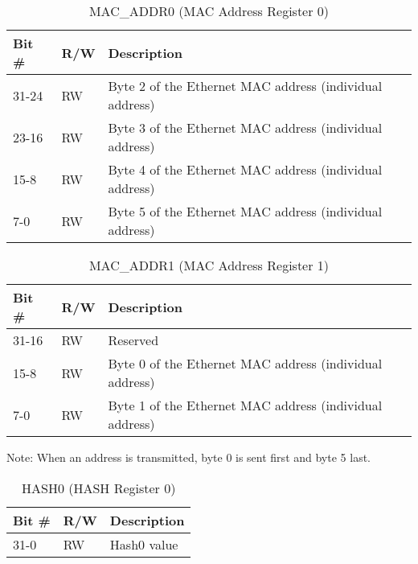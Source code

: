 \begin{table}[H]
  \centering
  \begin{tabularx}{\textwidth}{|l|l|X|}
    
    \hline
    \rowcolor{iob-green}
    {\bf Bit \#} & {\bf R/W} & {\bf Description} \\ \hline

    31-24   & RW  & Byte 2 of the Ethernet MAC address (individual address) \\
                    \hline
    \rowcolor{iob-blue}
    23-16   & RW  & Byte 3 of the Ethernet MAC address (individual address) \\
                    \hline
    15-8    & RW  & Byte 4 of the Ethernet MAC address (individual address) \\
                    \hline
    \rowcolor{iob-blue}
    7-0     & RW  & Byte 5 of the Ethernet MAC address (individual address) \\
                    \hline
  \end{tabularx}
    \caption{MAC\_ADDR0 (MAC Address Register 0)}
  \label{swreg_details:mac_addr0}
\end{table}

\begin{table}[H]
  \centering
  \begin{tabularx}{\textwidth}{|l|l|X|}
    
    \hline
    \rowcolor{iob-green}
    {\bf Bit \#} & {\bf R/W} & {\bf Description} \\ \hline

    31-16   & RW  & Reserved \\ \hline
    \rowcolor{iob-blue}
    15-8    & RW  & Byte 0 of the Ethernet MAC address (individual address) \\
                    \hline
    7-0     & RW  & Byte 1 of the Ethernet MAC address (individual address) \\
                    \hline
  \end{tabularx}
    \caption{MAC\_ADDR1 (MAC Address Register 1)}
  \label{swreg_details:mac_addr1}
\end{table}

Note: When an address is transmitted, byte 0 is sent first and byte 5 last.

\begin{table}[H]
  \centering
  \begin{tabularx}{\textwidth}{|l|l|X|}
    
    \hline
    \rowcolor{iob-green}
    {\bf Bit \#} & {\bf R/W} & {\bf Description} \\ \hline

    31-0   & RW  & Hash0 value \\ \hline
  \end{tabularx}
    \caption{HASH0 (HASH Register 0)}
  \label{swreg_details:hash0}
\end{table}

